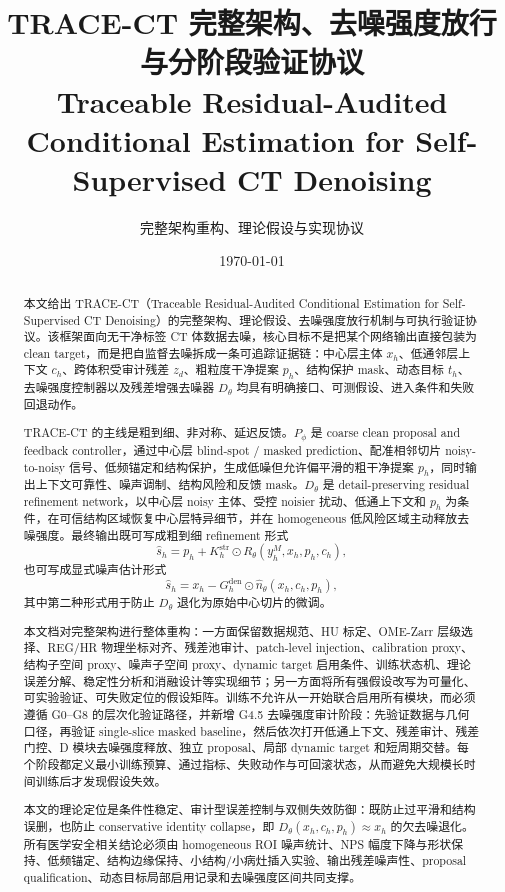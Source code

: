 \documentclass[11pt,a4paper,UTF8,fontset=fandol]{ctexart}
\theoremstyle{definition}
\begin{document}
\title{TRACE-CT 完整架构、去噪强度放行与分阶段验证协议\\
{\large Traceable Residual-Audited Conditional Estimation for Self-Supervised CT Denoising}}
\author{完整架构重构、理论假设与实现协议}
\date{\today}
\maketitle


\begin{abstract}
本文给出 TRACE-CT（Traceable Residual-Audited Conditional Estimation for Self-Supervised CT Denoising）的完整架构、理论假设、去噪强度放行机制与可执行验证协议。该框架面向无干净标签 CT 体数据去噪，核心目标不是把某个网络输出直接包装为 clean target，而是把自监督去噪拆成一条可追踪证据链：中心层主体 $x_h$、低通邻层上下文 $c_h$、跨体积受审计残差 $z_d$、粗粒度干净提案 $p_h$、结构保护 mask、动态目标 $t_h$、去噪强度控制器以及残差增强去噪器 $D_\theta$ 均具有明确接口、可测假设、进入条件和失败回退动作。

TRACE-CT 的主线是粗到细、非对称、延迟反馈。$P_\phi$ 是 coarse clean proposal and feedback controller，通过中心层 blind-spot / masked prediction、配准相邻切片 noisy-to-noisy 信号、低频锚定和结构保护，生成低噪但允许偏平滑的粗干净提案 $p_h$，同时输出上下文可靠性、噪声调制、结构风险和反馈 mask。$D_\theta$ 是 detail-preserving residual refinement network，以中心层 noisy 主体、受控 noisier 扰动、低通上下文和 $p_h$ 为条件，在可信结构区域恢复中心层特异细节，并在 homogeneous 低风险区域主动释放去噪强度。最终输出既可写成粗到细 refinement 形式
\[
\hat s_h=p_h+K_h^{\mathrm{str}}\odot R_\theta(y_h^M,x_h,p_h,c_h),
\]
也可写成显式噪声估计形式
\[
\hat s_h=x_h-G_h^{\mathrm{den}}\odot \hat n_\theta(x_h,c_h,p_h),
\]
其中第二种形式用于防止 $D_\theta$ 退化为原始中心切片的微调。

本文档对完整架构进行整体重构：一方面保留数据规范、HU 标定、OME-Zarr 层级选择、REG/HR 物理坐标对齐、残差池审计、patch-level injection、calibration proxy、结构子空间 proxy、噪声子空间 proxy、dynamic target 启用条件、训练状态机、理论误差分解、稳定性分析和消融设计等实现细节；另一方面将所有强假设改写为可量化、可实验验证、可失败定位的假设矩阵。训练不允许从一开始联合启用所有模块，而必须遵循 G0--G8 的层次化验证路径，并新增 G4.5 去噪强度审计阶段：先验证数据与几何口径，再验证 single-slice masked baseline，然后依次打开低通上下文、残差审计、残差门控、D 模块去噪强度释放、独立 proposal、局部 dynamic target 和短周期交替。每个阶段都定义最小训练预算、通过指标、失败动作与可回滚状态，从而避免大规模长时间训练后才发现假设失效。

本文的理论定位是条件性稳定、审计型误差控制与双侧失效防御：既防止过平滑和结构误删，也防止 conservative identity collapse，即 $D_\theta(x_h,c_h,p_h)\approx x_h$ 的欠去噪退化。所有医学安全相关结论必须由 homogeneous ROI 噪声统计、NPS 幅度下降与形状保持、低频锚定、结构边缘保持、小结构/小病灶插入实验、输出残差噪声性、proposal qualification、动态目标局部启用记录和去噪强度区间共同支撑。
\end{abstract}
\end{document}
